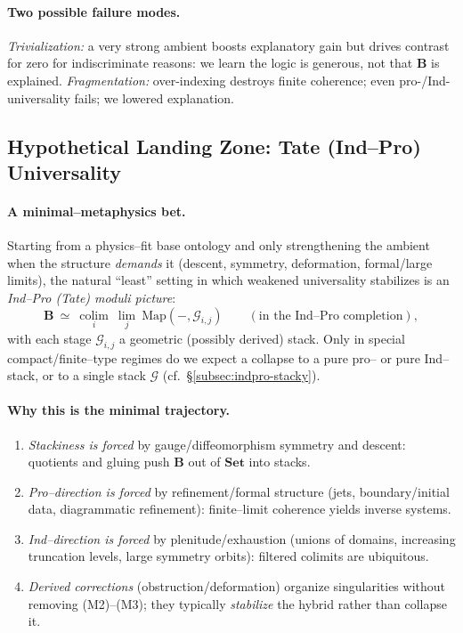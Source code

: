 \documentclass[11pt]{article}
\theoremstyle{upright}
\begin{document}
\paragraph{Two possible failure modes.}
\emph{Trivialization:} a very strong ambient boosts explanatory gain but drives contrast for zero for indiscriminate reasons: we learn the logic is generous, not that $\mathbf B$ is explained.  
\emph{Fragmentation:} over-indexing destroys finite coherence; even pro-/Ind- universality fails; we lowered explanation.

\subsection{Hypothetical Landing Zone: Tate (Ind–Pro) Universality}\label{subsec:landing-tate}
\paragraph{A minimal–metaphysics bet.}
Starting from a physics–fit base ontology and only strengthening the ambient when the structure \emph{demands} it (descent, symmetry, deformation, formal/large limits), the natural “least” setting in which weakened universality stabilizes is an \emph{Ind–Pro (Tate) moduli picture}:
\[
\mathbf B\ \simeq\ \operatorname*{colim}_{i}\ \operatorname*{lim}_{j}\ \mathrm{Map}(-,\mathcal G_{i,j})\qquad
(\text{in the Ind–Pro completion}),
\]
with each stage $\mathcal G_{i,j}$ a geometric (possibly derived) stack. Only in special compact/finite–type regimes do we expect a collapse to a pure pro– or pure Ind–stack, or to a single stack \(\mathcal G\) (cf.\ §\ref{subsec:indpro-stacky}).

\paragraph{Why this is the minimal trajectory.}
\begin{enumerate}[leftmargin=2em,label=(M\arabic*)]
\item \emph{Stackiness is forced} by gauge/diffeomorphism symmetry and descent: quotients and gluing push $\mathbf B$ out of $\mathbf{Set}$ into stacks.
\item \emph{Pro–direction is forced} by refinement/formal structure (jets, boundary/initial data, diagrammatic refinement): finite–limit coherence yields inverse systems.
\item \emph{Ind–direction is forced} by plenitude/exhaustion (unions of domains, increasing truncation levels, large symmetry orbits): filtered colimits are ubiquitous.
\item \emph{Derived corrections} (obstruction/deformation) organize singularities without removing (M2)–(M3); they typically \emph{stabilize} the hybrid rather than collapse it.
\end{enumerate}
\end{document}
